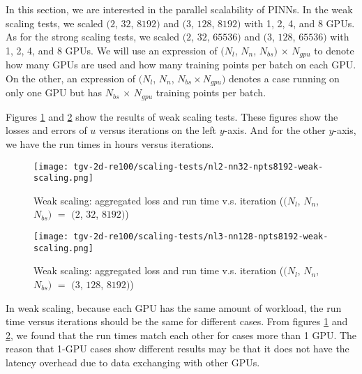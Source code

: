 
In this section, we are interested in the parallel scalability of PINNs.
In the weak scaling tests, we scaled $(2$, $32$, $8192)$ and $(3$, $128$, $8192)$ with 1, 2, 4, and 8 GPUs. 
As for the strong scaling tests, we scaled $(2$, $32$, $65536)$ and $(3$, $128$, $65536)$ with 1, 2, 4, and 8 GPUs. 
We will use an expression of $(N_l$, $N_n$, $N_{bs})$ $\times$ $N_{gpu}$ to denote how many GPUs are used and how many training points per batch on each GPU.
On the other, an expression of $(N_l$, $N_n$, $N_{bs}\times N_{gpu})$ denotes a case running on only one GPU but has $N_{bs}$ $\times$ $N_{gpu}$ training points per batch.

Figures \ref{fig:nl2-nn32-npts8192-weak-scaling} and \ref{fig:nl3-nn128-npts8192-weak-scaling} show the results of weak scaling tests.
These figures show the losses and errors of $u$ versus iterations on the left $y$-axis.
And for the other $y$-axis, we have the run times in hours versus iterations.

\begin{figure}[hbt!]
    \centering%
    \texttt{[image: tgv-2d-re100/scaling-tests/nl2-nn32-npts8192-weak-scaling.png]}
    \caption[%
        Weak scaling: aggregated loss and run time v.s. iteration ($(N_l$, $N_n$, $N_{bs})$ $=$ $(2$, $32$, $8192)$)%
    ]{%
        Weak scaling: aggregated loss and run time v.s. iteration ($(N_l$, $N_n$, $N_{bs})$ $=$ $(2$, $32$, $8192)$)%
    }\label{fig:nl2-nn32-npts8192-weak-scaling}
\end{figure}

\begin{figure}[hbt!]
    \centering%
    \texttt{[image: tgv-2d-re100/scaling-tests/nl3-nn128-npts8192-weak-scaling.png]}
    \caption[%
        Weak scaling: aggregated loss and run time v.s. iteration ($(N_l$, $N_n$, $N_{bs})$ $=$ $(3$, $128$, $8192)$)%
    ]{%
        Weak scaling: aggregated loss and run time v.s. iteration ($(N_l$, $N_n$, $N_{bs})$ $=$ $(3$, $128$, $8192)$)%
    }\label{fig:nl3-nn128-npts8192-weak-scaling}
\end{figure}

In weak scaling, because each GPU has the same amount of workload, the run time versus iterations should be the same for different cases.
From figures \ref{fig:nl2-nn32-npts8192-weak-scaling} and \ref{fig:nl3-nn128-npts8192-weak-scaling}, we found that the run times match each other for cases more than 1 GPU.
The reason that 1-GPU cases show different results may be that it does not have the latency overhead due to data exchanging with other GPUs.

